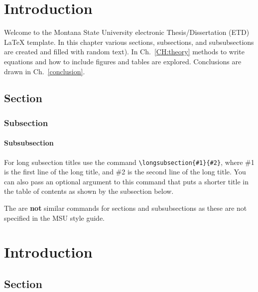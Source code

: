 \chapter{Introduction}\label{CH:introduction}
Welcome to the Montana State University electronic Thesis/Dissertation (ETD) \LaTeX{} template.  In this chapter various sections, subsections, and subsubsections are created and filled with random text).  In Ch.~\ref{CH:theory} methods to write equations and how to include figures and tables are explored. Conclusions are drawn in Ch.~\ref{conclusion}.


\section{Section}\label{Sect:test}
\lipsum[1] %

\subsection{Subsection}\label{Sect:testsub}
\lipsum[2] %

\subsubsection{Subsubsection}\label{Sect:testsubsub}
\lipsum[3] %

\label{Sect:longsub}
For long subsection titles use the command \verb|\longsubsection{#1}{#2}|, where \#1 is the first line of the long title, and \#2 is the second line of the long title. You can also pass an optional argument to this command that puts a shorter title in the table of contents as shown by the subsection below.

\label{Sect:longsub2}
The are \textbf{not} similar commands for sections and subsubsections as these are not specified in the MSU style guide.  

\chapter{Introduction}

\section{Section}
\lipsum[1] %

